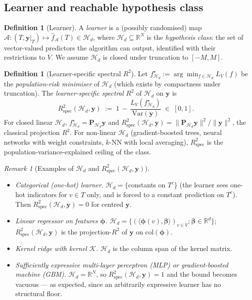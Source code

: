 \documentclass[11pt,a4paper]{article}
\theoremstyle{plain}
\theoremstyle{definition}
\newtheorem{definition}[theorem]{Definition}
\theoremstyle{remark}
\newtheorem{remark}[theorem]{Remark}
\newcommand{\bphi}{\boldsymbol{\phi}}
\newcommand{\by}{\mathbf{y}}
\newcommand{\bP}{\mathbf{P}}
\newcommand{\R}{\mathbb{R}}
\newcommand{\Var}{\mathrm{Var}}
\newcommand{\Rspec}{R^2_{\mathrm{spec}}}
\newcommand{\Acal}{\mathcal{A}}
\newcommand{\Hcal}{\mathcal{H}}
\begin{document}
\subsection{Learner and reachable hypothesis class}
\label{subsec:setup-learner}

\begin{definition}[Learner]
\label{def:learner}
A \emph{learner} is a (possibly randomised) map $\Acal : (T, \by|_T)
\mapsto \hat f_\Acal(T) \in \Hcal_d$, where $\Hcal_d \subseteq \R^N$ is
the \emph{hypothesis class}: the set of vector-valued predictors the
algorithm can output, identified with their restrictions to $V$.  We
assume $\Hcal_d$ is closed under truncation to $[-M, M]$.
\end{definition}

\begin{definition}[Learner-specific spectral $R^2$]
\label{def:learner-rspec}
Let $f^\star_{\Hcal_d} := \arg\min_{f \in \Hcal_d} L_V(f)$ be the
\emph{population-risk minimiser} of $\Hcal_d$ (which exists by
compactness under truncation).  The \emph{learner-specific spectral
$R^2$} of $\Hcal_d$ on $\by$ is
\begin{equation}
    \Rspec(\Hcal_d, \by) \;:=\; 1 \,-\, \frac{L_V(f^\star_{\Hcal_d})}{\Var(\by)} \;\in\; [0, 1].
    \label{eq:rspec-learner-defn}
\end{equation}
For closed linear $\Hcal_d$, $f^\star_{\Hcal_d} = \bP_{\Hcal_d}\by$ and
$\Rspec(\Hcal_d, \by) = \|\bP_{\Hcal_d}\by\|^2/\|\by\|^2$, the classical
projection $R^2$.  For non-linear $\Hcal_d$ (gradient-boosted trees,
neural networks with weight constraints, $k$-NN with local averaging),
$\Rspec$ is the population-variance-explained ceiling of the class.
\end{definition}

\begin{remark}[Examples of $\Hcal_d$ and $\Rspec(\Hcal_d, \by)$]
\label{rem:examples}
\begin{itemize}[label=$\bullet$,leftmargin=*]
\item \emph{Categorical (one-hot) learner.}  $\Hcal_d = \{$constants on $T^c\}$
    (the learner sees one-hot indicators for $v \in T$ only, and is
    forced to a constant prediction on $T^c$).  Then
    $\Rspec(\Hcal_d, \by) = 0$ for centred $\by$.
\item \emph{Linear regressor on features $\bphi$.}
    $\Hcal_d = \{(\langle \bphi(v), \bm{\beta}\rangle)_{v \in V} : \bm{\beta} \in \R^d\}$;
    $\Rspec(\Hcal_d, \by)$ is the projection-$R^2$ of $\by$ on
    $\mathrm{col}(\bphi)$.
\item \emph{Kernel ridge with kernel $\mathcal{K}$.}  $\Hcal_d$ is the
    column span of the kernel matrix.
\item \emph{Sufficiently expressive multi-layer perceptron (MLP) or
    gradient-boosted machine (GBM).}  $\Hcal_d = \R^N$, so
    $\Rspec(\Hcal_d, \by) = 1$ and the bound becomes vacuous --- as
    expected, since an arbitrarily expressive learner has no structural
    floor.
\end{itemize}
\end{remark}
\end{document}
